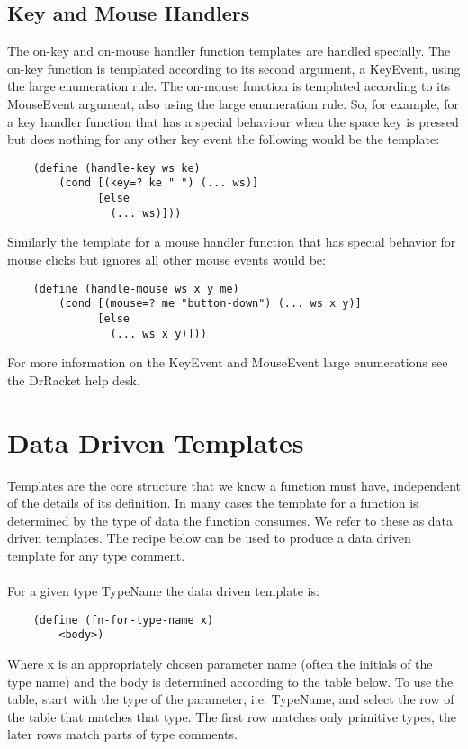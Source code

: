 \documentclass[11pt,a4paper]{report}
\begin{document}
	\section{Key and Mouse Handlers}
	The on-key and on-mouse handler function templates are handled specially. The on-key
	function is templated according to its second argument, a KeyEvent, using the large enumeration
	rule. The on-mouse function is templated according to its MouseEvent argument, also using the
	large enumeration rule. So, for example, for a key handler function that has a special behaviour
	when the space key is pressed but does nothing for any other key event the following would be
	the template:
	
	\begin{verbatim}
	(define (handle-key ws ke)
		(cond [(key=? ke " ") (... ws)]
		      [else
		        (... ws)]))
	\end{verbatim}
	
	Similarly the template for a mouse handler function that has special behavior for mouse clicks but
	ignores all other mouse events would be:
	
	\begin{verbatim}
	(define (handle-mouse ws x y me)
		(cond [(mouse=? me "button-down") (... ws x y)]
		      [else
		        (... ws x y)]))
	\end{verbatim}
	
	For more information on the KeyEvent and MouseEvent large enumerations see the DrRacket
	help desk.
	
	\chapter{Data Driven Templates} \label{ch:data_driv_temp}
	Templates are the core structure that we know a function must have, independent of the details
	of its definition. In many cases the template for a function is determined by the type of data the
	function consumes. We refer to these as data driven templates. The recipe below can be used to
	produce a data driven template for any type comment.
	\\ \\
	For a given type TypeName the data driven template is:
	
	\begin{verbatim}
	(define (fn-for-type-name x)
		<body>)
	\end{verbatim}
	
	Where x is an appropriately chosen parameter name (often the initials of the type name) and the
	body is determined according to the table below. To use the table, start with the type of the
	parameter, i.e. TypeName, and select the row of the table that matches that type. The first row
	matches only primitive types, the later rows match parts of type comments.
	
\end{document}
